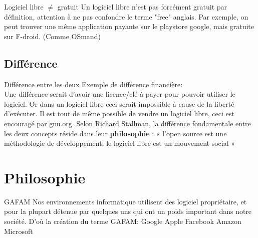 \documentclass{beamer}
\begin{document}
\begin{frame}{Logiciel libre $ \ne $ gratuit}
	Un logiciel libre n'est pas forcément gratuit par définition, attention à ne pas confondre le terme "free" anglais.
	\newline
	\newline
	Par exemple, on peut trouver une même application payante sur le playstore google, mais gratuite sur F-droid. (Comme OSmand)
\end{frame}

\subsection{Différence}
\begin{frame}{Différence entre les deux}
	Exemple de différence financière: \\
	Une différence serait d'avoir une licence/clé à payer pour pouvoir utiliser le logiciel. Or dans un logiciel libre ceci serait impossible à cause de la liberté d’exécuter.
	\newline
	\newline
	Il est tout de même possible de vendre un logiciel libre, ceci est encouragé par gnu.org. 	\newline
	\newline
	Selon Richard Stallman, la différence fondamentale entre les deux concepts réside dans leur \textbf{philosophie} : « l'open source est une méthodologie de développement; le logiciel libre est un mouvement social »
\end{frame}




\section{Philosophie}
\begin{frame}{GAFAM}
Nos environnements informatique utilisent des logiciel propriétaire, et pour la plupart détenue par quelques uns qui ont un poids important dans notre société. \newline
\newline
D'où la création du terme GAFAM: Google Apple Facebook Amazon Microsoft
\end{frame}
\end{document}
